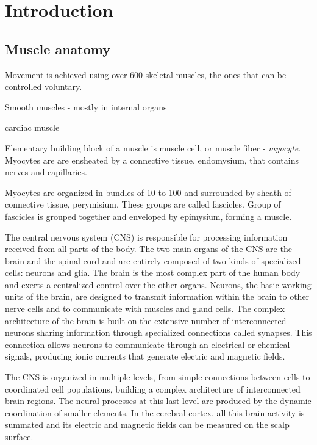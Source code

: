 
\chapter{Introduction}





\section{Muscle anatomy}

Movement is achieved using over 600 skeletal muscles, the ones that can be controlled voluntary. 

Smooth muscles - mostly in internal organs

cardiac muscle

Elementary building block of a muscle is muscle cell, or muscle fiber - \emph{myocyte}. Myocytes are are ensheated by a connective tissue, endomysium, that contains nerves and capillaries. 

Myocytes are organized in bundles of 10 to 100 and surrounded by sheath of connective tissue, perymisium. These groups are called fascicles. Group of fascicles is grouped together and enveloped by epimysium, forming a muscle. 

The central nervous system (CNS) is responsible for processing information received from all parts of the body. The two main organs of the CNS are the brain and the spinal cord and are entirely composed of two kinds of specialized cells: neurons and glia. The brain is the most complex part of the human body and exerts a centralized control over the other organs. Neurons, the basic working units of the brain, are designed to transmit information within the brain to other nerve cells and to communicate with muscles and gland cells. The complex architecture of the brain is built on the extensive number of interconnected neurons sharing information through specialized connections called synapses. This connection allows  neurons to communicate through an electrical or chemical signals, producing ionic currents that generate electric and magnetic fields. 

The CNS is organized in multiple levels, from simple connections between cells to coordinated cell populations, building a complex architecture of interconnected brain regions. The neural processes at this last level are produced by the dynamic coordination of smaller elements. In the cerebral cortex, all this brain activity is summated and its electric and magnetic fields can be measured on the scalp surface. 

\

